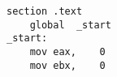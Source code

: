 \begin{lstlisting}[caption={{\ttfamily sort.s}}]
    section .text
    global  _start
_start:
    mov eax,    0
    mov ebx,    0
\end{lstlisting}
